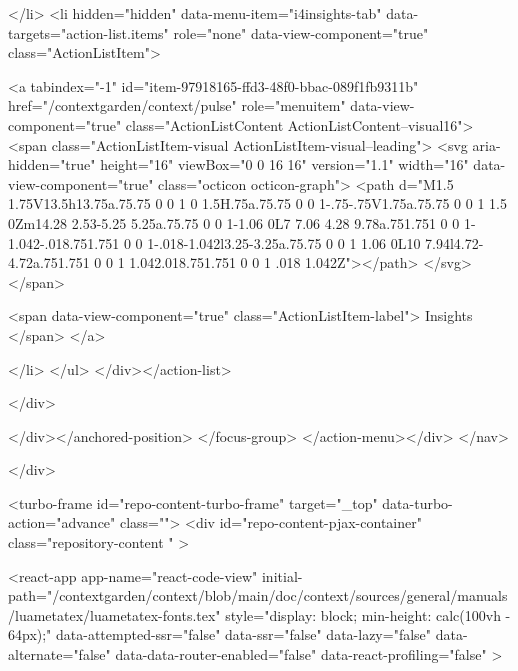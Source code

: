 </li>
        <li hidden="hidden" data-menu-item="i4insights-tab" data-targets="action-list.items" role="none" data-view-component="true" class="ActionListItem">
    
    
    <a tabindex="-1" id="item-97918165-ffd3-48f0-bbac-089f1fb9311b" href="/contextgarden/context/pulse" role="menuitem" data-view-component="true" class="ActionListContent ActionListContent--visual16">
        <span class="ActionListItem-visual ActionListItem-visual--leading">
          <svg aria-hidden="true" height="16" viewBox="0 0 16 16" version="1.1" width="16" data-view-component="true" class="octicon octicon-graph">
    <path d="M1.5 1.75V13.5h13.75a.75.75 0 0 1 0 1.5H.75a.75.75 0 0 1-.75-.75V1.75a.75.75 0 0 1 1.5 0Zm14.28 2.53-5.25 5.25a.75.75 0 0 1-1.06 0L7 7.06 4.28 9.78a.751.751 0 0 1-1.042-.018.751.751 0 0 1-.018-1.042l3.25-3.25a.75.75 0 0 1 1.06 0L10 7.94l4.72-4.72a.751.751 0 0 1 1.042.018.751.751 0 0 1 .018 1.042Z"></path>
</svg>
        </span>
      
        <span data-view-component="true" class="ActionListItem-label">
          Insights
</span>      
</a>
  
</li>
</ul>    
</div></action-list>


</div>
      
</div></anchored-position>  </focus-group>
</action-menu></div>
</nav>

  </div>

  



<turbo-frame id="repo-content-turbo-frame" target="_top" data-turbo-action="advance" class="">
    <div id="repo-content-pjax-container" class="repository-content " >
    



    
      
    








<react-app
  app-name="react-code-view"
  initial-path="/contextgarden/context/blob/main/doc/context/sources/general/manuals/luametatex/luametatex-fonts.tex"
    style="display: block; min-height: calc(100vh - 64px);"
  data-attempted-ssr="false"
  data-ssr="false"
  data-lazy="false"
  data-alternate="false"
  data-data-router-enabled="false"
  data-react-profiling="false"
>
  
